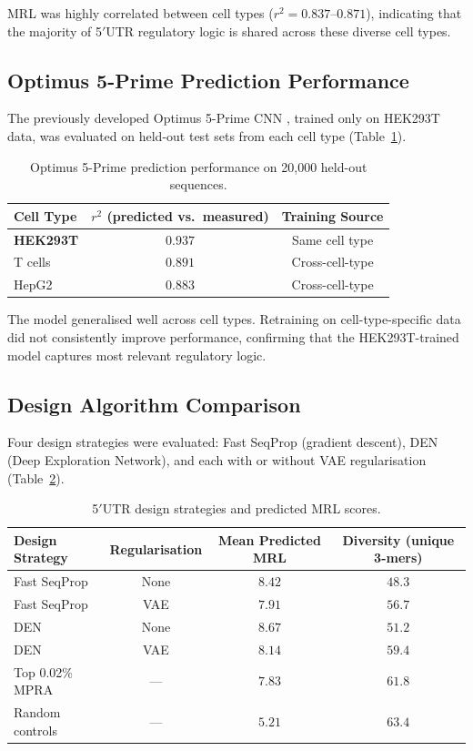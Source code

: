 \documentclass[11pt]{article}
\begin{document}
MRL was highly correlated between cell types ($r^2 = 0.837$--$0.871$), indicating that the majority of 5$'$UTR regulatory logic is shared across these diverse cell types.

\subsection{Optimus 5-Prime Prediction Performance}

The previously developed Optimus 5-Prime CNN \citep{sample2019human}, trained only on HEK293T data, was evaluated on held-out test sets from each cell type (Table~\ref{tab:prediction}).

\begin{table}[H]
\centering
\caption{Optimus 5-Prime prediction performance on 20,000 held-out sequences.}
\label{tab:prediction}
\begin{tabular}{@{}lcc@{}}
\toprule
Cell Type & $r^2$ (predicted vs.\ measured) & Training Source \\
\midrule
\textbf{HEK293T} & $\mathbf{0.937}$ & Same cell type \\
T cells & $0.891$ & Cross-cell-type \\
HepG2 & $0.883$ & Cross-cell-type \\
\bottomrule
\end{tabular}
\end{table}

The model generalised well across cell types. Retraining on cell-type-specific data did not consistently improve performance, confirming that the HEK293T-trained model captures most relevant regulatory logic.

\subsection{Design Algorithm Comparison}

Four design strategies were evaluated: Fast SeqProp (gradient descent), DEN (Deep Exploration Network), and each with or without VAE regularisation (Table~\ref{tab:designs}).

\begin{table}[H]
\centering
\caption{5$'$UTR design strategies and predicted MRL scores.}
\label{tab:designs}
\begin{tabular}{@{}lccc@{}}
\toprule
Design Strategy & Regularisation & Mean Predicted MRL & Diversity (unique 3-mers) \\
\midrule
Fast SeqProp & None & $8.42$ & $48.3$ \\
Fast SeqProp & VAE & $7.91$ & $56.7$ \\
DEN & None & $8.67$ & $51.2$ \\
DEN & VAE & $8.14$ & $59.4$ \\
\midrule
Top 0.02\% MPRA & --- & $7.83$ & $61.8$ \\
Random controls & --- & $5.21$ & $63.4$ \\
\bottomrule
\end{tabular}
\end{table}
\end{document}
